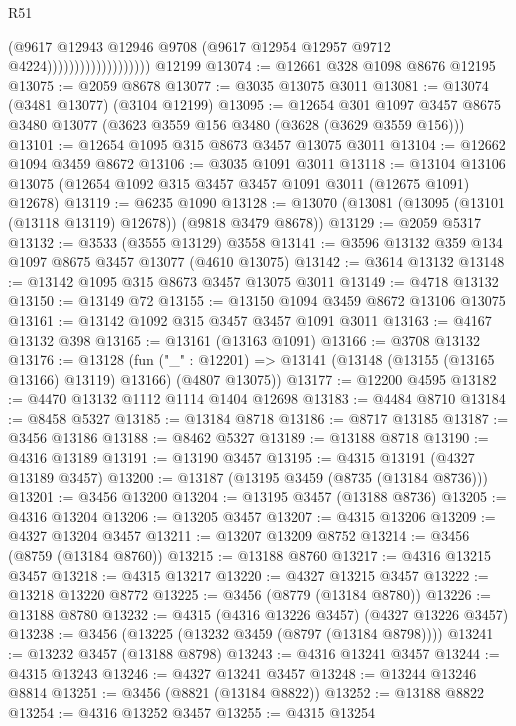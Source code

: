 \begin{lexlean}{R51}
\begin{coremodule}
                                      (@9617
                                        @12943
                                        @12946
                                        @9708
                                        (@9617 @12954 @12957 @9712 @4224)))))))))))))))))))
    @12199
@13074 := @12661 @328 @1098 @8676 @12195
@13075 := @2059 @8678
@13077 := @3035 @13075 @3011
@13081 := @13074 (@3481 @13077) (@3104 @12199)
@13095 := @12654
    @301
    @1097
    @3457
    @8675
    @3480
    @13077
    (@3623 @3559 @156 @3480 (@3628 (@3629 @3559 @156)))
@13101 := @12654 @1095 @315 @8673 @3457 @13075 @3011
@13104 := @12662 @1094 @3459 @8672
@13106 := @3035 @1091 @3011
@13118 := @13104 @13106 @13075 (@12654 @1092 @315 @3457 @3457 @1091 @3011 (@12675 @1091) @12678)
@13119 := @6235 @1090
@13128 := @13070 (@13081 (@13095 (@13101 (@13118 @13119) @12678)) (@9818 @3479 @8678))
@13129 := @2059 @5317
@13132 := @3533 (@3555 @13129) @3558
@13141 := @3596 @13132 @359 @134 @1097 @8675 @3457 @13077 (@4610 @13075)
@13142 := @3614 @13132
@13148 := @13142 @1095 @315 @8673 @3457 @13075 @3011
@13149 := @4718 @13132
@13150 := @13149 @72
@13155 := @13150 @1094 @3459 @8672 @13106 @13075
@13161 := @13142 @1092 @315 @3457 @3457 @1091 @3011
@13163 := @4167 @13132 @398
@13165 := @13161 (@13163 @1091)
@13166 := @3708 @13132
@13176 := @13128
    (fun ("_" : @12201) => @13141 (@13148 (@13155 (@13165 @13166) @13119) @13166) (@4807 @13075))
@13177 := @12200 @4595
@13182 := @4470 @13132 @1112 @1114 @1404 @12698
@13183 := @4484 @8710
@13184 := @8458 @5327
@13185 := @13184 @8718
@13186 := @8717 @13185
@13187 := @3456 @13186
@13188 := @8462 @5327
@13189 := @13188 @8718
@13190 := @4316 @13189
@13191 := @13190 @3457
@13195 := @4315 @13191 (@4327 @13189 @3457)
@13200 := @13187 (@13195 @3459 (@8735 (@13184 @8736)))
@13201 := @3456 @13200
@13204 := @13195 @3457 (@13188 @8736)
@13205 := @4316 @13204
@13206 := @13205 @3457
@13207 := @4315 @13206
@13209 := @4327 @13204 @3457
@13211 := @13207 @13209 @8752
@13214 := @3456 (@8759 (@13184 @8760))
@13215 := @13188 @8760
@13217 := @4316 @13215 @3457
@13218 := @4315 @13217
@13220 := @4327 @13215 @3457
@13222 := @13218 @13220 @8772
@13225 := @3456 (@8779 (@13184 @8780))
@13226 := @13188 @8780
@13232 := @4315 (@4316 @13226 @3457) (@4327 @13226 @3457)
@13238 := @3456 (@13225 (@13232 @3459 (@8797 (@13184 @8798))))
@13241 := @13232 @3457 (@13188 @8798)
@13243 := @4316 @13241 @3457
@13244 := @4315 @13243
@13246 := @4327 @13241 @3457
@13248 := @13244 @13246 @8814
@13251 := @3456 (@8821 (@13184 @8822))
@13252 := @13188 @8822
@13254 := @4316 @13252 @3457
@13255 := @4315 @13254

\end{coremodule}
\end{lexlean}
